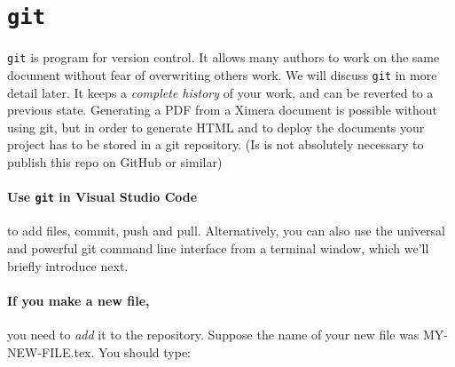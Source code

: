 \documentclass{ximera}
\begin{document}

\section{\texttt{git}}
\texttt{git} is program for version control. It allows many authors
to work on the same document without fear
of overwriting others work. We will discuss \texttt{git} in more detail later.
It keeps a \textit{complete history} of your work, and can be reverted to a
previous state. 
Generating a PDF from a Ximera document is possible without using git, but in order to
generate HTML and to deploy the documents your project has to be stored in a git repository.
(Is is not absolutely necessary to publish this repo on GitHub or similar)

\paragraph{Use \texttt{git} in Visual Studio Code} to add files, commit, push and pull.
Alternatively, you can also use the universal and powerful git command line interface from a 
terminal window, which we'll briefly introduce next.

\paragraph{If you make a new file,} you need to \textit{add} it to the
repository. Suppose the name of your new file was MY-NEW-FILE.tex. You should
type:
\end{document}
